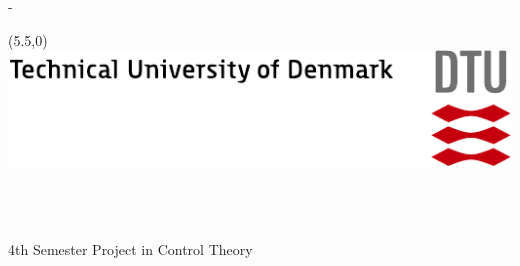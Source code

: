 \begin{titlingpage}
 \thispagestyle{empty}
 \enlargethispage{1.3cm}
 \calccentering{\unitlength}
 \begin{adjustwidth}{\unitlength}{-\unitlength}
  \vspace*{-1.9cm}
  \begin{textblock}{6.5}(5.5,0) %
   \includegraphics[width=\textwidth]{resources/tex_dtu_uk_a1_cmyk}
  \end{textblock}
  \begin{raggedright}
   {\Huge\sffamily\ThAuthors\\[2cm]}
   \begin{Spacing}{1.2}
    {\sffamily\HUGE\textbf{\ThTitleEN}\\[1.5cm]}
    {\sffamily\LARGE{4th Semester Project in Control Theory}\\[2cm]}
   \end{Spacing}
 \end{raggedright}



\end{adjustwidth}
\end{titlingpage}
